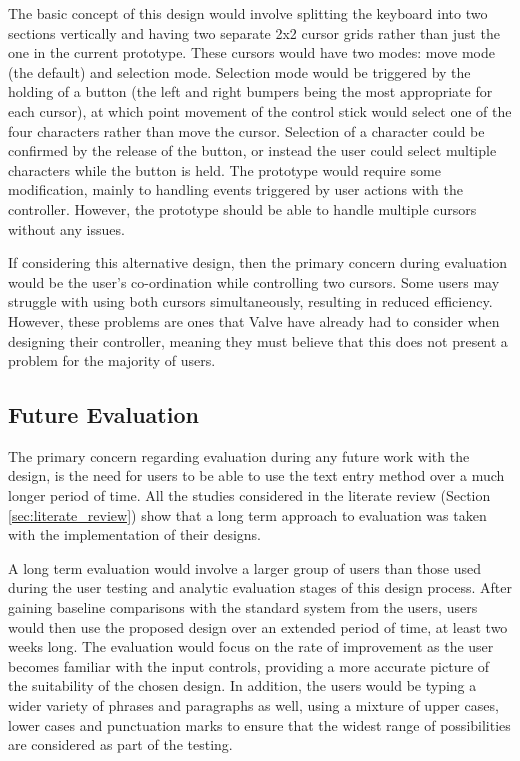 \documentclass[future.tex]{subfiles}
\begin{document}
The basic concept of this design would involve splitting the keyboard into
two sections vertically and having two separate 2x2 cursor grids rather than
just the one in the current prototype. These cursors would have two modes: move
mode (the default) and selection mode. Selection mode would be triggered by the
holding of a button (the left and right bumpers being the most appropriate for
each cursor), at which point movement of the control stick would select one of
the four characters rather than move the cursor. Selection of a character could
be confirmed by the release of the button, or instead the user could select
multiple characters while the button is held. The prototype would require some
modification, mainly to handling events triggered by user actions with the
controller. However, the prototype should be able to handle multiple cursors
without any issues.

If considering this alternative design, then the primary concern during
evaluation would be the user's co-ordination while controlling two cursors.
Some users may struggle with using both cursors simultaneously, resulting in
reduced efficiency. However, these problems are ones that Valve have already had
to consider when designing their controller, meaning they must believe that this
does not present a problem for the majority of users.

\subsection{Future Evaluation} %
\label{sub:future_evaluation}
The primary concern regarding evaluation during any future work with the design,
is the need for users to be able to use the text entry method over a much longer
period of time. All the studies considered in the literate review (Section
\ref{sec:literate_review}) show that a long term approach to evaluation was
taken with the implementation of their designs.

A long term evaluation would involve a larger group of users than those used
during the user testing and analytic evaluation stages of this design process.
After gaining baseline comparisons with the standard system from the users,
users would then use the proposed design over an extended period of time, at
least two weeks long. The evaluation would focus on the rate of improvement as
the user becomes familiar with the input controls, providing a more accurate
picture of the suitability of the chosen design. In addition, the users would
be typing a wider variety of phrases and paragraphs as well, using a mixture of
upper cases, lower cases and punctuation marks to ensure that the widest range
of possibilities are considered as part of the testing.
\end{document}
